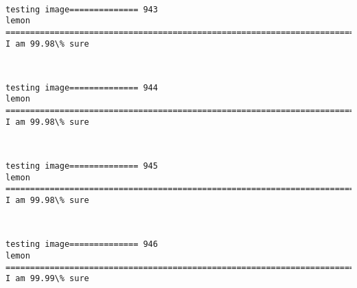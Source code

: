 \documentclass[11pt]{article}
\begin{document}
    \begin{center}
    \end{center}
    { \hspace*{\fill} \\}
    
    \begin{Verbatim}[commandchars=\\\{\}]
testing image============== 943
lemon
============================================================================
I am 99.98\% sure

    \end{Verbatim}

    \begin{center}
    \end{center}
    { \hspace*{\fill} \\}
    
    \begin{Verbatim}[commandchars=\\\{\}]
testing image============== 944
lemon
============================================================================
I am 99.98\% sure

    \end{Verbatim}

    \begin{center}
    \end{center}
    { \hspace*{\fill} \\}
    
    \begin{Verbatim}[commandchars=\\\{\}]
testing image============== 945
lemon
============================================================================
I am 99.98\% sure

    \end{Verbatim}

    \begin{center}
    \end{center}
    { \hspace*{\fill} \\}
    
    \begin{Verbatim}[commandchars=\\\{\}]
testing image============== 946
lemon
============================================================================
I am 99.99\% sure

    \end{Verbatim}
\end{document}
